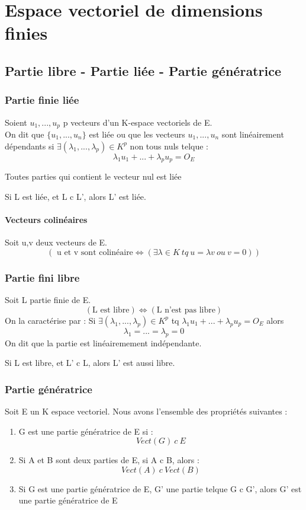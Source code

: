 \chapter{Espace vectoriel de dimensions finies}
\section{Partie libre - Partie liée - Partie génératrice}
\subsection{Partie finie liée}
\begin{de}
Soient $u_1,...,u_p$ p vecteurs d'un K-espace vectoriels de E.\\
On dit que $\{u_1,...,u_n\}$ est liée ou que les vecteurs $u_1,...,u_n$ sont linéairement dépendants si $\exists(\lambda_1,...,\lambda_p)\in K^p$ non tous nuls telque : $$\lambda_1u_1+...+\lambda_pu_p = O_E$$
\end{de}
\begin{prop}
Toutes parties qui contient le vecteur nul est liée
\end{prop}
\begin{prop}
Si L est liée, et L c L', alors L' est liée.
\end{prop}
\subsubsection{Vecteurs colinéaires}
Soit u,v deux vecteurs de E.
$$(\mbox{ u et v sont colinéaire} \Leftrightarrow (\exists \lambda \in K~ tq~ u=\lambda v~ ou~ v=0))$$
\subsection{Partie fini libre}
\begin{de}
 Soit L partie finie de E.
$$(\mbox{L est libre}) \Leftrightarrow (\mbox{L n'est pas libre})$$
On la caractérise par : Si $\exists(\lambda_1,...,\lambda_p)\in K^p$ tq $\lambda_1u_1+...+\lambda_pu_p = O_E$ alors $$\lambda_1=...=\lambda_p=0$$
On dit que la partie est linéairemement indépendante.
\end{de}
\begin{prop}
Si L est libre, et L' c L, alors L' est aussi libre.
\end{prop}
\subsection{Partie génératrice}
Soit E un K espace vectoriel.
Nous avons l'ensemble des propriétés suivantes :
\begin{enumerate}[1-]
 \item G est une partie génératrice de E si : $$Vect(G)~ c~ E$$
 \item Si A et B sont deux parties de E, si A c B, alors : $$Vect(A)~ c~ Vect(B)$$
 \item Si G est une partie génératrice de E, G' une partie telque G c G', alors G' est une partie génératrice de E
\end{enumerate}

